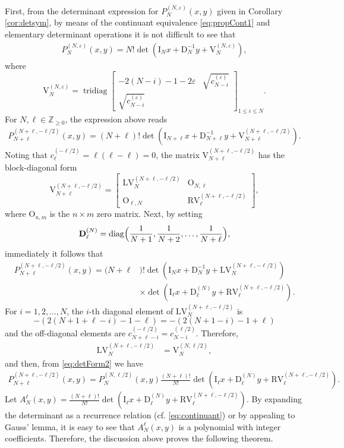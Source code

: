 \documentclass[11pt]{article}
\numberwithin{equation}{section}
\newcommand{\Z}{\mathbb{Z}} %
\newcommand{\e}{\varepsilon}
\newcommand{\cp}[2]{P^{(#1)}_{#2}} %
\DeclareMathOperator{\diag}{diag}
\DeclareMathOperator{\tridiag}{tridiag}
\newcommand{\Tridiag}[4]{\tridiag\mat{#1 & #2 \\ #3}_{#4}}
\newcommand{\mat}[1]{\begin{bmatrix}#1\end{bmatrix}}
\newcommand{\MatSymbol}[1]{\bm{\mathrm{#1}}}
\newcommand{\mD}{\MatSymbol{D}}
\newcommand{\mI}{\MatSymbol{I}}
\newcommand{\mV}{\MatSymbol{V}}
\newcommand{\mLV}{\MatSymbol{LV}}
\newcommand{\mRV}{\MatSymbol{RV}}
\newcommand{\mO}{\MatSymbol{O}}
\theoremstyle{plain}
\theoremstyle{definition}
\theoremstyle{remark}
\begin{document}
First, from the determinant expression for \(\cp{N,\e}{N}(x,y)\) given in Corollary \ref{cor:detsym},
by means of the continuant equivalence \eqref{eq:propCont1} and elementary determinant operations it is not difficult to see that
\begin{align}\label{eq:detForm2}
  \cp{N,\e}{N}(x,y) = N! \det\left( \mI_N x + \mD_N^{-1} y + \mV_N^{(N,\e)} \right),
\end{align}
where
\[
  \mV_N^{(N,\e)} = \Tridiag{-2(N-i)-1-2\e }{\sqrt{c^{(\e)}_{N-i}}}{\sqrt{c^{(\e)}_{N-i}}}{1\le i\le N}.
\]
For \( N, \ell \in \Z_{\geq 0} \), the expression above reads
\begin{align}\label{eq:detform3}
  \cp{N+\ell,-\ell/2}{N+\ell}(x,y)
  = (N+\ell)! \det\left( \mI_{N+\ell} x + \mD_{N+\ell}^{-1} y + \mV_{N+\ell}^{(N+\ell,-\ell/2)} \right).
\end{align}
Noting that \(c_{\ell}^{(-\ell/2)} = \ell(\ell - \ell)= 0\), the matrix
\(\mV_{N+\ell}^{(N+\ell,-\ell/2)} \) has the block-diagonal form
\[
  \mV_{N+\ell}^{(N+\ell,-\ell/2)} =
  \begin{bmatrix}
    \mLV_{N}^{(N+\ell,-\ell/2)} & \mO_{N,\ell} \\
    \mO_{\ell,N} & \mRV_{\ell}^{(N+\ell,-\ell/2)}
  \end{bmatrix},
\]
where \(\mO_{n,m} \) is the \(n \times m \) zero matrix. Next, by setting
\[
  \mD^{(N)}_\ell = \diag\Bigl(\frac1{N+1},\frac1{N+2},\dots,\frac1{N+\ell}\Bigr),
\]
immediately it follows that
\begin{align*}
  \cp{N+\ell,-\ell/2}{N+\ell}(x,y)  =(N+\ell&)! \det\left( \mI_{N} x + \mD_{N}^{-1} y + \mLV_{N}^{(N+\ell,-\ell/2)} \right) \\
  &\times \det\left( \mI_{\ell} x + \mD^{(N)}_{\ell} y + \mRV_{\ell}^{(N+\ell,-\ell/2)} \right).
\end{align*}
For \(i =1,2,\ldots,N\), the \(i\)-th diagonal element of
\(\mLV_N^{(N+\ell,-\ell/2)} \) is \[-(2(N+1+\ell-i)-1 - \ell) = -(2(N+1-i) -1 +\ell) \]
and the off-diagonal elements are \(c_{N+\ell-i}^{(-\ell/2)} = c_{N-i}^{(\ell/2)}\). Therefore,
\begin{align*}
  \mLV_N^{(N+\ell,-\ell/2)} &= \mV_N^{(N,\ell/2)},
\end{align*}
and then, from \eqref{eq:detForm2} we have
\begin{align*}
  \cp{N+\ell,-\ell/2}{N+\ell}(x,y) = \cp{N,\ell/2}{N}(x,y) \frac{(N+\ell)!}{N!}
  \det\left( \mI_{\ell} x + \mD^{(N)}_{\ell} y + \mRV_{\ell}^{(N+\ell,-\ell/2)} \right).
\end{align*}
Let \(A_{N}^\ell(x,y) = \frac{(N+\ell)!}{N!} \det\left( \mI_{\ell} x + \mD^{(N)}_{\ell} y + \mRV_{\ell}^{(N+\ell,-\ell/2)} \right)\).
By expanding the determinant as a recurrence relation (cf. \eqref{eq:continuant}) or by appealing to Gauss' lemma, it is
easy to see that \( A_{N}^\ell(x,y)\) is a polynomial with integer coefficients. Therefore, the discussion above proves the
following theorem.
\end{document}

